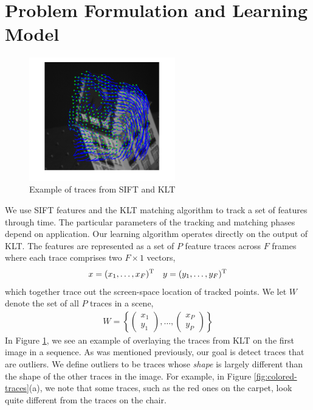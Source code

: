 \section{Problem Formulation and Learning Model}
\label{sec:formulation}

\begin{figure}[h]
	\begin{center}
		\includegraphics[width=2.5in]{figs/hotel-traces.png}
	\end{center}
	\caption{Example of traces from SIFT and KLT}
	\label{fig:traces}
\end{figure}


We use SIFT features and the KLT matching algorithm to track a set of features
through time.  The particular parameters of the tracking and matching phases
depend on application.  Our learning algorithm operates directly on the output
of KLT.  The features are represented as a set of $P$ feature traces across $F$
frames where each trace comprises two $F\times 1$ vectors,
\begin{align*}
x = (x_1, \ldots, x_F)^{\rm T} && y = (y_1, \ldots, y_F)^{\rm T}
\end{align*}
which together trace out the screen-space location of tracked points.  
We let $W$ denote the set of all $P$ traces in a scene,
\begin{align*}
	W = \left\{ \left( \begin{array}{c} x_1 \\ y_1\end{array} \right), \ldots, \left( \begin{array}{c} x_P \\ y_P\end{array} \right) \right\}	
\end{align*}
In Figure \ref{fig:traces}, we see an example of overlaying the traces from KLT
on the first image in a sequence.  As was mentioned previously, our goal is
detect traces that are outliers.  We define outliers to be traces whose {\it
shape} is largely different than the shape of the other traces in the image.
For example, in Figure \ref{fig:colored-traces}(a), we note that some traces,
such as the red ones on the carpet, look quite different from the traces on the
chair.

